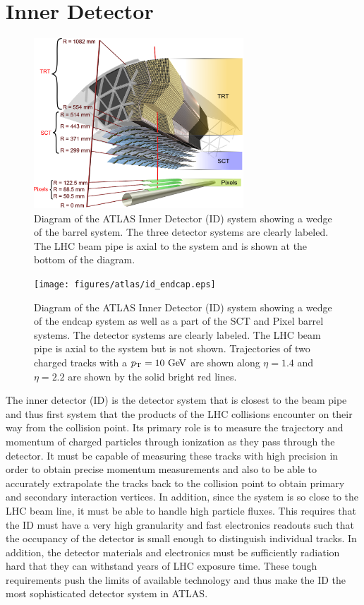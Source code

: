 \section{Inner Detector}
\label{sec:atlas_id}

\begin{figure}[ht!]
\centering
\includegraphics[width=0.7\textwidth]{figures/atlas/id_barrel.eps}
\caption{Diagram of the ATLAS Inner Detector (ID) system showing 
a wedge of the barrel system.  The three detector systems
are clearly labeled. The LHC beam pipe is axial to the system
and is shown at the bottom of the diagram.}
\label{fig:atlas_id_barrel}
\end{figure}

\begin{figure}[ht!]
\centering
\texttt{[image: figures/atlas/id\_endcap.eps]}
\caption{Diagram of the ATLAS Inner Detector (ID) system showing 
a wedge of the endcap system as well as a part of the SCT and Pixel
barrel systems.  The detector systems
are clearly labeled.  The LHC beam pipe is axial to the system
but is not shown. Trajectories of two charged tracks 
with a $\pt=10\GeV$ are shown along $\eta=1.4$ and $\eta=2.2$ are shown 
by the solid bright red lines.}
\label{fig:atlas_id_endcap}
\end{figure}

The inner detector (ID) is the 
detector system that is closest to the beam pipe and thus
first system that the products of the LHC collisions encounter
on their way from the collision point. Its primary role is 
to measure the trajectory and momentum of charged particles
through ionization as they pass through the detector.
It must be capable of measuring these tracks with high precision
in order to obtain precise momentum measurements and also to be able
to accurately extrapolate the tracks back to the collision point
to obtain primary and secondary interaction vertices. In addition,
since the system is so close to the LHC beam line, it
must be able to handle high particle fluxes. This requires that
the ID must have a very high granularity and fast electronics
readouts such that the occupancy of the
detector is small enough to distinguish individual tracks. In addition,
the detector materials and electronics must be sufficiently radiation
hard that they can withstand years of LHC exposure time.
These tough requirements push the limits of available technology and thus
make the ID the most sophisticated detector system in ATLAS.



